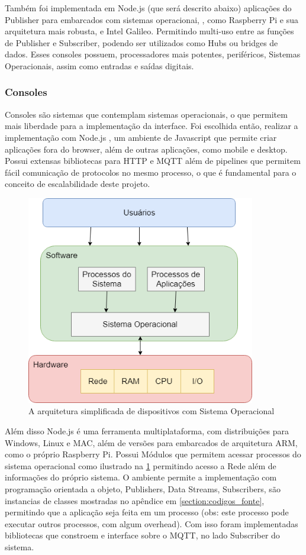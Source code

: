 Também foi implementada em Node.js (que será descrito abaixo) aplicações do Publisher para embarcados com sistemas operacionai, \cite{arm}, como Raspberry Pi \cite{raspberry-pi} e sua arquitetura mais robusta, e Intel Galileo. Permitindo multi-uso entre as funções de Publisher e Subscriber, podendo ser utilizados como Hubs ou bridges de dados. Esses consoles possuem, processadores mais potentes, periféricos, Sistemas Operacionais, assim como entradas e saídas digitais.


\subsubsection{Consoles}
\label{subsubsection:consoles}

Consoles são sistemas que contemplam sistemas operacionais, o que permitem mais liberdade para a implementação da interface. Foi escolhida então, realizar a implementação com Node.js \cite{nodejs}, um ambiente de Javascript que permite criar aplicações fora do browser, além de outras aplicações, como mobile e desktop. Possui extensas bibliotecas para HTTP e MQTT além de pipelines que permitem fácil comunicação de protocolos no mesmo processo, o que é fundamental para o conceito de escalabilidade deste projeto.


\begin{figure}[h!]
\centering
\includegraphics[width=10cm]{./02_Capitulos/02_Cap3/figures/os-diagram}
\caption{A arquitetura simplificada de dispositivos com Sistema Operacional}
\label{fig:3.3.4/os-diagram}
\end{figure}


Além disso Node.js é uma ferramenta multiplataforma, com distribuições para Windows, Linux e MAC, além de versões para embarcados de arquitetura ARM, como o próprio Raspberry Pi. Possui Módulos que permitem acessar processos do sistema operacional como ilustrado na \ref{fig:3.3.4/os-diagram} permitindo acesso a Rede além de informações do próprio sistema. O ambiente permite a implementação com programação orientada a objeto, Publishers, Data Streams, Subscribers, são instancias de classes mostradas no apêndice em \ref{section:codigos_fonte}, permitindo que a aplicação seja feita em um processo (obs: este processo pode executar outros processos, com algum overhead).  Com isso foram implementadas bibliotecas que constroem e interface sobre o MQTT, no lado Subscriber do sistema.

